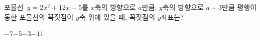 포물선~$y=2x^2+12x+5$를 $x$축의 방향으로 $a$만큼, $y$축의 방향으로 $a+3$만큼 평행이동한 포물선의 꼭짓점이 $y$축 위에 있을 때, 꼭짓점의 $y$좌표는?
\begin{choices32}{$-7$}{$-5$}{$-3$}{$-1$}{$1$}\end{choices32}
